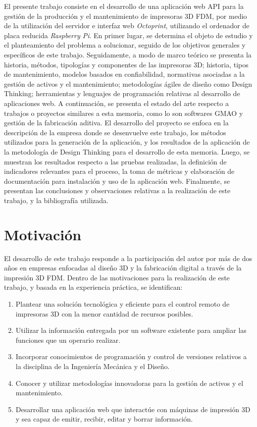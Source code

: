 El presente trabajo consiste en el desarrollo de una aplicación web API para la gestión de la producción y el mantenimiento de impresoras 3D FDM, por medio de la utilización del servidor e interfaz web \textit{Octoprint}, utilizando el ordenador de placa reducida \textit{Raspberry Pi}.  
En primer lugar, se determina el objeto de estudio y el planteamiento del problema a solucionar, seguido de los objetivos generales y específicos de este trabajo. Seguidamente, a modo de marco teórico se presenta la historia, métodos, tipologías y componentes de las impresoras 3D; historia, tipos de mantenimiento, modelos basados en confiabilidad, normativas asociadas a la gestión de activos y el mantenimiento; metodologías ágiles de diseño como Design Thinking; herramientas y lenguajes de programación relativas al desarrollo de aplicaciones web. A continuación, se presenta el estado del arte respecto a trabajos o proyectos similares a esta memoria, como lo son softwares GMAO y gestión de la fabricación aditiva. El desarrollo del proyecto se enfoca en la descripción de la empresa donde se desenvuelve este trabajo, los métodos utilizados para la generación de la aplicación, y los resultados de la aplicación de la metodología de Design Thinking para el desarrollo de esta memoria. Luego, se muestran los resultados respecto a las pruebas realizadas, la definición de indicadores relevantes para el proceso, la toma de métricas y elaboración de documentación para instalación y uso de la aplicación web. Finalmente, se presentan las conclusiones y observaciones relativas a la realización de este trabajo, y la bibliografía utilizada. 


\section{Motivación}

El desarrollo de este trabajo responde a la participación del autor por más de dos años en empresas enfocadas al diseño 3D y la fabricación digital a través de la impresión 3D FDM. Dentro de las motivaciones para la realización de este trabajo, y basada en la experiencia práctica, se identifican:

\begin{enumerate}
	\item Plantear una solución tecnológica y eficiente para el control remoto de impresoras 3D con la menor cantidad de recursos posibles.
	\item Utilizar la información entregada por un software existente para ampliar las funciones que un operario realizar.
	\item Incorporar conocimientos de programación y control de versiones relativos a la disciplina de la Ingeniería Mecánica y el Diseño.
	\item Conocer y utilizar metodologías innovadoras para la gestión de activos y el mantenimiento.
	\item Desarrollar  una aplicación web que interactúe con máquinas de impresión 3D y sea capaz de emitir, recibir, editar y borrar información.   
\end{enumerate} 
\clearpage





